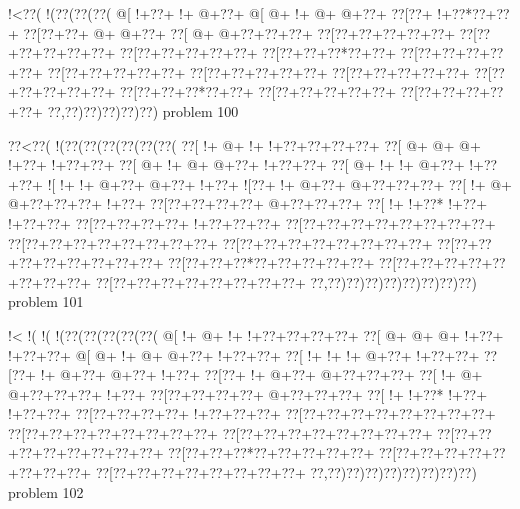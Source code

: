 \vbox{\vbox{\goo
\- !<\0??(\- !(\0??(\0??(\0??(
\- @[\- !+\0??+\- !+\- @+\0??+
\- @[\- @+\- !+\- @+\- @+\0??+
\0??[\0??+\- !+\0??*\0??+\0??+
\0??[\0??+\0??+\- @+\- @+\0??+
\0??[\- @+\- @+\0??+\0??+\0??+
\0??[\0??+\0??+\0??+\0??+\0??+
\0??[\0??+\0??+\0??+\0??+\0??+
\0??[\0??+\0??+\0??+\0??+\0??+
\0??[\0??+\0??+\0??*\0??+\0??+
\0??[\0??+\0??+\0??+\0??+\0??+
\0??[\0??+\0??+\0??+\0??+\0??+
\0??[\0??+\0??+\0??+\0??+\0??+
\0??[\0??+\0??+\0??+\0??+\0??+
\0??[\0??+\0??+\0??+\0??+\0??+
\0??[\0??+\0??+\0??*\0??+\0??+
\0??[\0??+\0??+\0??+\0??+\0??+
\0??[\0??+\0??+\0??+\0??+\0??+
\0??,\0??)\0??)\0??)\0??)\0??)
}
\hfil problem 100\hfil\break
}

\vbox{\vbox{\goo
\0??<\0??(\- !(\0??(\0??(\0??(\0??(\0??(\0??(
\0??[\- !+\- @+\- !+\- !+\0??+\0??+\0??+\0??+
\0??[\- @+\- @+\- @+\- !+\0??+\- !+\0??+\0??+
\0??[\- @+\- !+\- @+\- @+\0??+\- !+\0??+\0??+
\0??[\- @+\- !+\- !+\- @+\0??+\- !+\0??+\0??+
\- ![\- !+\- !+\- @+\0??+\- @+\0??+\- !+\0??+
\- ![\0??+\- !+\- @+\0??+\- @+\0??+\0??+\0??+
\0??[\- !+\- @+\- @+\0??+\0??+\0??+\- !+\0??+
\0??[\0??+\0??+\0??+\0??+\- @+\0??+\0??+\0??+
\0??[\- !+\- !+\0??*\- !+\0??+\- !+\0??+\0??+
\0??[\0??+\0??+\0??+\0??+\- !+\0??+\0??+\0??+
\0??[\0??+\0??+\0??+\0??+\0??+\0??+\0??+\0??+
\0??[\0??+\0??+\0??+\0??+\0??+\0??+\0??+\0??+
\0??[\0??+\0??+\0??+\0??+\0??+\0??+\0??+\0??+
\0??[\0??+\0??+\0??+\0??+\0??+\0??+\0??+\0??+
\0??[\0??+\0??+\0??*\0??+\0??+\0??+\0??+\0??+
\0??[\0??+\0??+\0??+\0??+\0??+\0??+\0??+\0??+
\0??[\0??+\0??+\0??+\0??+\0??+\0??+\0??+\0??+
\0??,\0??)\0??)\0??)\0??)\0??)\0??)\0??)\0??)
}
\hfil problem 101\hfil\break
}

\vbox{\vbox{\goo
\- !<\- !(\- !(\- !(\0??(\0??(\0??(\0??(\0??(
\- @[\- !+\- @+\- !+\- !+\0??+\0??+\0??+\0??+
\0??[\- @+\- @+\- @+\- !+\0??+\- !+\0??+\0??+
\- @[\- @+\- !+\- @+\- @+\0??+\- !+\0??+\0??+
\0??[\- !+\- !+\- !+\- @+\0??+\- !+\0??+\0??+
\0??[\0??+\- !+\- @+\0??+\- @+\0??+\- !+\0??+
\0??[\0??+\- !+\- @+\0??+\- @+\0??+\0??+\0??+
\0??[\- !+\- @+\- @+\0??+\0??+\0??+\- !+\0??+
\0??[\0??+\0??+\0??+\0??+\- @+\0??+\0??+\0??+
\0??[\- !+\- !+\0??*\- !+\0??+\- !+\0??+\0??+
\0??[\0??+\0??+\0??+\0??+\- !+\0??+\0??+\0??+
\0??[\0??+\0??+\0??+\0??+\0??+\0??+\0??+\0??+
\0??[\0??+\0??+\0??+\0??+\0??+\0??+\0??+\0??+
\0??[\0??+\0??+\0??+\0??+\0??+\0??+\0??+\0??+
\0??[\0??+\0??+\0??+\0??+\0??+\0??+\0??+\0??+
\0??[\0??+\0??+\0??*\0??+\0??+\0??+\0??+\0??+
\0??[\0??+\0??+\0??+\0??+\0??+\0??+\0??+\0??+
\0??[\0??+\0??+\0??+\0??+\0??+\0??+\0??+\0??+
\0??,\0??)\0??)\0??)\0??)\0??)\0??)\0??)\0??)
}
\hfil problem 102\hfil\break
}

